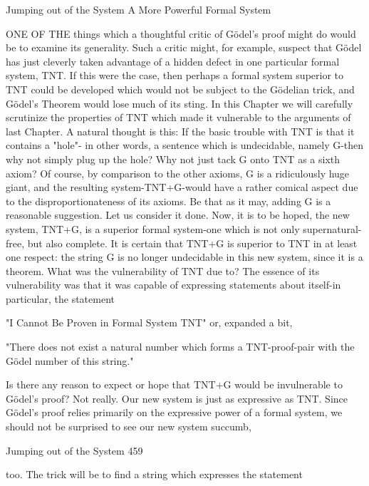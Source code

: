                         Jumping out of the System
                             A More Powerful Formal System

ONE OF THE things which a thoughtful critic of Gödel’s proof might do would be to
examine its generality. Such a critic might, for example, suspect that Gödel has just
cleverly taken advantage of a hidden defect in one particular formal system, TNT. If this
were the case, then perhaps a formal system superior to TNT could be developed which
would not be subject to the Gödelian trick, and Gödel’s Theorem would lose much of its
sting. In this Chapter we will carefully scrutinize the properties of TNT which made it
vulnerable to the arguments of last Chapter.
         A natural thought is this: If the basic trouble with TNT is that it contains a "hole"-
in other words, a sentence which is undecidable, namely G-then why not simply plug up
the hole? Why not just tack G onto TNT as a sixth axiom? Of course, by comparison to
the other axioms, G is a ridiculously huge giant, and the resulting system-TNT+G-would
have a rather comical aspect due to the disproportionateness of its axioms. Be that as it
may, adding G is a reasonable suggestion. Let us consider it done. Now, it is to be hoped,
the new system, TNT+G, is a superior formal system-one which is not only supernatural-
free, but also complete. It is certain that TNT+G is superior to TNT in at least one
respect: the string G is no longer undecidable in this new system, since it is a theorem.
         What was the vulnerability of TNT due to? The essence of its vulnerability was
that it was capable of expressing statements about itself-in particular, the statement

                       "I Cannot Be Proven in Formal System TNT"
or, expanded a bit,

      "There does not exist a natural number which forms a TNT-proof-pair with
      the Gödel number of this string."

Is there any reason to expect or hope that TNT+G would be invulnerable to Gödel’s
proof? Not really. Our new system is just as expressive as TNT. Since Gödel’s proof
relies primarily on the expressive power of a formal system, we should not be surprised
to see our new system succumb,




Jumping out of the System                                                                  459

too. The trick will be to find a string which expresses the statement


